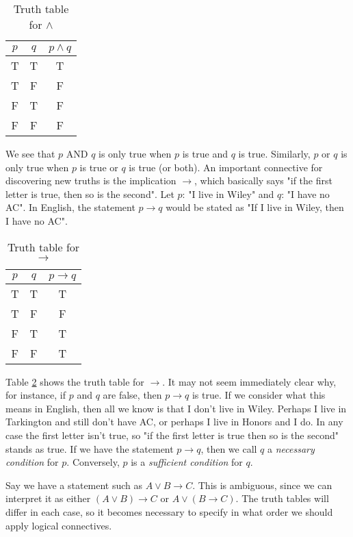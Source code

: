 \documentclass[nobib]{tufte-handout}
\begin{document}
\begin{table}[ht]
    \centering
    \begin{tabular}{|c c|c|}
    \hline
    $p$ & $q$ & $p \land q$ \\
    \hline
    T & T & T \\
    T & F & F \\
    F & T & F \\
    F & F & F \\
    \hline
    \end{tabular}
    \caption{Truth table for $\land$}
    \label{tab:truthtableand}
\end{table}
We see that $p$ AND $q$ is only true when $p$ is true and 
$q$ is true. Similarly, $p$ or $q$ is only true when $p$ is true or 
$q$ is true (or both). An important connective for 
discovering new truths is the implication $\rightarrow$, which basically
says "if the first letter is true, then so is the second".
Let $p$: "I live in Wiley" and $q$: "I have no AC". In English,
the statement $p \rightarrow q$ would be stated as "If I live in 
Wiley, then I have no AC". 

\begin{table}[ht]
    \centering
    \begin{tabular}{|c c|c|}
    \hline
    $p$ & $q$ & $p \rightarrow q$ \\
    \hline
    T & T & T \\
    T & F & F \\
    F & T & T \\
    F & F & T\\
    \hline
    \end{tabular}
    \caption{Truth table for $\rightarrow$}
    \label{tab:truthtableimp}
\end{table}
Table \ref{tab:truthtableimp} shows the truth table for $\rightarrow$.
It may not seem immediately clear why, for instance, 
if $p$ and $q$ are false, then $p \rightarrow q$ is true.
If we consider what this means in English, then all we know is 
that I don't live in Wiley. Perhaps I live in Tarkington and still
don't have AC, or perhaps I live in Honors and I do. In any case
the first letter isn't true, so "if the first letter is true
then so is the second" stands as true. If we have the statement 
$p \rightarrow q$, then we call $q$ a \emph{necessary condition}
for $p$. Conversely, $p$ is a \emph{sufficient condition} for $q$.

Say we have a statement such as 
$A \lor B \rightarrow C$.
This is ambiguous, since we can interpret 
it as either $(A \lor B) \rightarrow C$ 
or $A \lor (B \rightarrow C)$. The truth tables
will differ in each case, so it 
becomes necessary to specify in
what order we should apply logical
connectives. 
\end{document}
